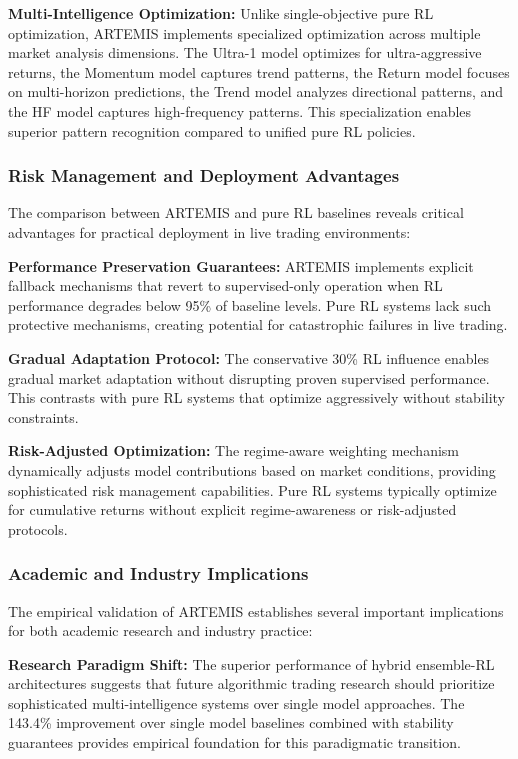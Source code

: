 \documentclass[10pt,twocolumn]{article}
\begin{document}
\textbf{Multi-Intelligence Optimization:} Unlike single-objective pure RL optimization, ARTEMIS implements specialized optimization across multiple market analysis dimensions. The Ultra-1 model optimizes for ultra-aggressive returns, the Momentum model captures trend patterns, the Return model focuses on multi-horizon predictions, the Trend model analyzes directional patterns, and the HF model captures high-frequency patterns. This specialization enables superior pattern recognition compared to unified pure RL policies.

\subsubsection{Risk Management and Deployment Advantages}

The comparison between ARTEMIS and pure RL baselines reveals critical advantages for practical deployment in live trading environments:

\textbf{Performance Preservation Guarantees:} ARTEMIS implements explicit fallback mechanisms that revert to supervised-only operation when RL performance degrades below 95\% of baseline levels. Pure RL systems lack such protective mechanisms, creating potential for catastrophic failures in live trading.

\textbf{Gradual Adaptation Protocol:} The conservative 30\% RL influence enables gradual market adaptation without disrupting proven supervised performance. This contrasts with pure RL systems that optimize aggressively without stability constraints.

\textbf{Risk-Adjusted Optimization:} The regime-aware weighting mechanism dynamically adjusts model contributions based on market conditions, providing sophisticated risk management capabilities. Pure RL systems typically optimize for cumulative returns without explicit regime-awareness or risk-adjusted protocols.

\subsubsection{Academic and Industry Implications}

The empirical validation of ARTEMIS establishes several important implications for both academic research and industry practice:

\textbf{Research Paradigm Shift:} The superior performance of hybrid ensemble-RL architectures suggests that future algorithmic trading research should prioritize sophisticated multi-intelligence systems over single model approaches. The 143.4\% improvement over single model baselines combined with stability guarantees provides empirical foundation for this paradigmatic transition.
\end{document}
